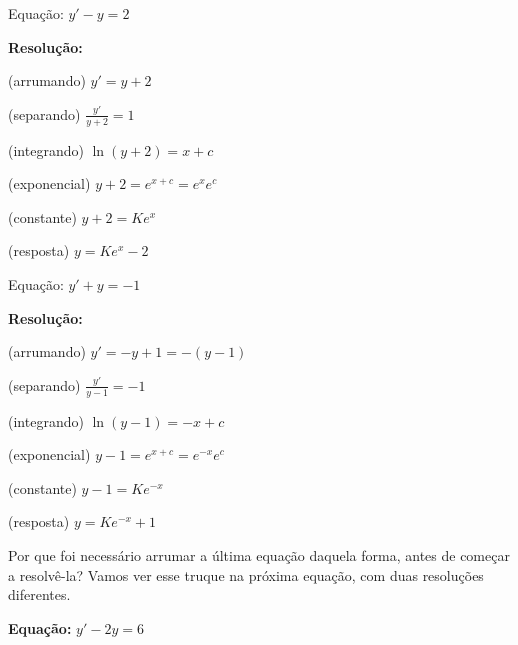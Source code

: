 \documentclass[a4paper]{article}
\begin{document}
\begin{multicols}{2}

Equação: $y' - y =2$

{\bf Resolução:}

(arrumando) $y' = y + 2$

(separando) $\frac{y'}{y+2} = 1$

\smallskip

(integrando) $\ln (y+2) = x+c$

(exponencial) $y+2 = e^{x+c}=e^{x}e^c$

(constante) $y+2=Ke^{x}$

(resposta) $y=Ke^{x}-2$

\columnbreak

Equação: $y' + y =-1$

{\bf Resolução:}

(arrumando) $y' = - y+1 = -(y-1)$

(separando) $\frac{y'}{y-1} = -1$

\smallskip

(integrando) $\ln (y-1) = -x+c$

(exponencial) $y-1 = e^{x+c}=e^{-x}e^c$

(constante) $y-1=Ke^{-x}$

(resposta) $y=Ke^{-x}+1$

\end{multicols}

Por que foi necessário arrumar a última equação daquela forma, antes
de começar a resolvê-la? Vamos ver esse truque na próxima equação, com
duas resoluções diferentes.

{\bf Equação:}
$y' - 2y = 6$
\end{document}
